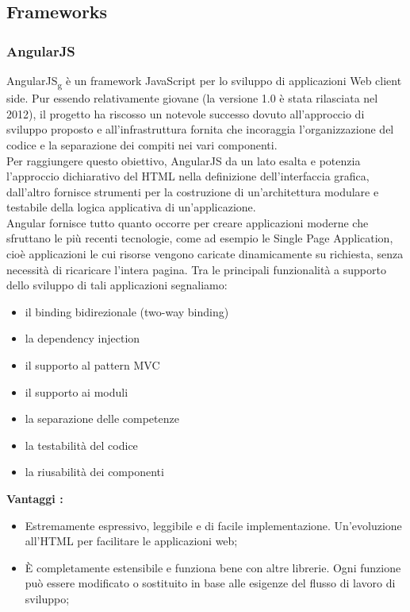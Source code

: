 {	\subsection{Frameworks}{
		\subsubsection{AngularJS}{
			{AngularJS}\textsubscript{g} è un framework JavaScript per lo sviluppo di applicazioni Web client side. Pur essendo relativamente giovane (la versione 1.0 è stata rilasciata nel 2012), il progetto ha riscosso un notevole successo dovuto all'approccio di sviluppo proposto e all'infrastruttura fornita che incoraggia l’organizzazione del codice e la separazione dei compiti nei vari componenti.\\
			Per raggiungere questo obiettivo, AngularJS da un lato esalta e potenzia l’approccio dichiarativo del HTML nella definizione dell'interfaccia grafica, dall'altro fornisce strumenti per la costruzione di un’architettura modulare e testabile della logica applicativa di un’applicazione.\\
			Angular fornisce tutto quanto occorre per creare applicazioni moderne che sfruttano le più recenti tecnologie, come ad esempio le Single Page Application, cioè applicazioni le cui risorse vengono caricate dinamicamente su richiesta, senza necessità di ricaricare l’intera pagina. Tra le principali funzionalità a supporto dello sviluppo di tali applicazioni segnaliamo:
			\begin{itemize}
				\item il binding bidirezionale (two-way binding)
				\item la dependency injection
				\item il supporto al pattern MVC
				\item il supporto ai moduli
				\item la separazione delle competenze
				\item la testabilità del codice
				\item la riusabilità dei componenti
			\end{itemize}
			\textbf{Vantaggi :}
			\begin{itemize}\itemsep1pt
				\item Estremamente espressivo, leggibile e di facile implementazione. Un'evoluzione all'HTML per facilitare le applicazioni web;
				\item È completamente estensibile e funziona bene con altre librerie. Ogni funzione può essere modificato o sostituito in base alle esigenze del flusso di lavoro di sviluppo;

\end{itemize}}}}
